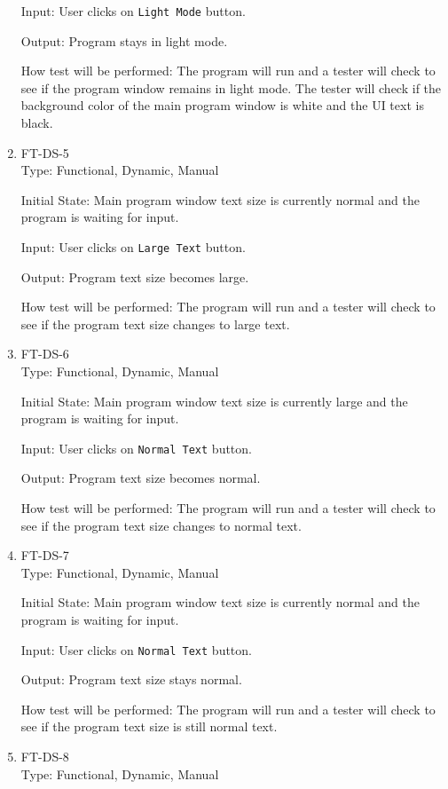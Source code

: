 \documentclass[12pt, titlepage]{article}
\begin{document}
\begin{enumerate}
Input: User clicks on \texttt{Light Mode} button.

Output: Program stays in light mode.

How test will be performed: The program will run and a tester will check to see if the program window remains in light mode. The tester will check if the background color of the main program window is white and the UI text is black.

\item{FT-DS-5}\\
Type: Functional, Dynamic, Manual

Initial State: Main program window text size is currently normal and the program is waiting for input. %

Input: User clicks on \texttt{Large Text} button.

Output: Program text size becomes large.

How test will be performed: The program will run and a tester will check to see if the program text size changes to large text.

\item{FT-DS-6}\\
Type: Functional, Dynamic, Manual

Initial State: Main program window text size is currently large and the program is waiting for input. %

Input: User clicks on \texttt{Normal Text} button.

Output: Program text size becomes normal.

How test will be performed: The program will run and a tester will check to see if the program text size changes to normal text.

\item{FT-DS-7}\\
Type: Functional, Dynamic, Manual

Initial State: Main program window text size is currently normal and the program is waiting for input. %

Input: User clicks on \texttt{Normal Text} button.

Output: Program text size stays normal.

How test will be performed: The program will run and a tester will check to see if the program text size is still normal text.

\item{FT-DS-8}\\
Type: Functional, Dynamic, Manual


\end{enumerate}
\end{document}
